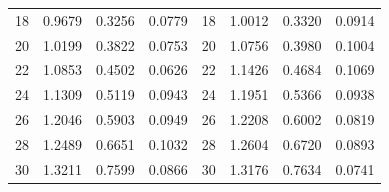 \begin{table}[!ht]
\begin{tabular}{c c c c | c c c c}
18 & 0.9679  & 0.3256 & 0.0779  & 18 & 1.0012  & 0.3320 & 0.0914 \\
20 & 1.0199  & 0.3822 & 0.0753  & 20 & 1.0756  & 0.3980 & 0.1004 \\
22 & 1.0853  & 0.4502 & 0.0626  & 22 & 1.1426  & 0.4684 & 0.1069 \\
24 & 1.1309  & 0.5119 & 0.0943  & 24 & 1.1951  & 0.5366 & 0.0938 \\
26 & 1.2046  & 0.5903 & 0.0949  & 26 & 1.2208  & 0.6002 & 0.0819 \\
28 & 1.2489  & 0.6651 & 0.1032  & 28 & 1.2604  & 0.6720 & 0.0893 \\
30 & 1.3211  & 0.7599 & 0.0866  & 30 & 1.3176  & 0.7634 & 0.0741 \\
\hline
\end{tabular}
\end{table}

